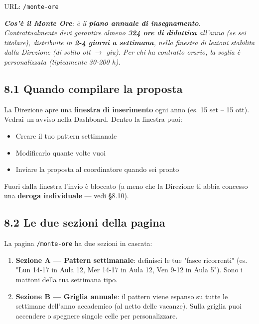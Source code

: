 \documentclass[11pt,a4paper]{article}
\renewenvironment{quote}
  {\begin{list}{}{%
      \setlength{\leftmargin}{8pt}%
      \setlength{\rightmargin}{8pt}%
      \setlength{\topsep}{6pt}%
      \setlength{\parsep}{0pt}}%
      \item\relax\color{black!75}\itshape}
  {\end{list}}
\begin{document}
URL: \texttt{/monte-ore}

\begin{quote}
\textbf{Cos'è il Monte Ore}: è il \textbf{piano annuale di insegnamento}. Contrattualmente devi garantire almeno \textbf{324 ore di didattica} all'anno (se sei titolare), distribuite in \textbf{2-4 giorni a settimana}, nella finestra di lezioni stabilita dalla Direzione (di solito ott $\rightarrow$ giu). Per chi ha contratto orario, la soglia è personalizzata (tipicamente 30-200 h).
\end{quote}

\subsection{8.1 Quando compilare la proposta}


La Direzione apre una \textbf{finestra di inserimento} ogni anno (es. 15 set -- 15 ott). Vedrai un avviso nella Dashboard. Dentro la finestra puoi:

\begin{itemize}
  \item Creare il tuo pattern settimanale
  \item Modificarlo quante volte vuoi
  \item Inviare la proposta al coordinatore quando sei pronto
\end{itemize}

Fuori dalla finestra l'invio è bloccato (a meno che la Direzione ti abbia concesso una \textbf{deroga individuale} --- vedi §8.10).

\subsection{8.2 Le due sezioni della pagina}


La pagina \texttt{/monte-ore} ha due sezioni in cascata:

\begin{enumerate}
  \item \textbf{Sezione A --- Pattern settimanale}: definisci le tue "fasce ricorrenti" (es. "Lun 14-17 in Aula 12, Mer 14-17 in Aula 12, Ven 9-12 in Aula 5"). Sono i mattoni della tua settimana tipo.
  \item \textbf{Sezione B --- Griglia annuale}: il pattern viene espanso su tutte le settimane dell'anno accademico (al netto delle vacanze). Sulla griglia puoi accendere o spegnere singole celle per personalizzare.
\end{enumerate}
\end{document}
